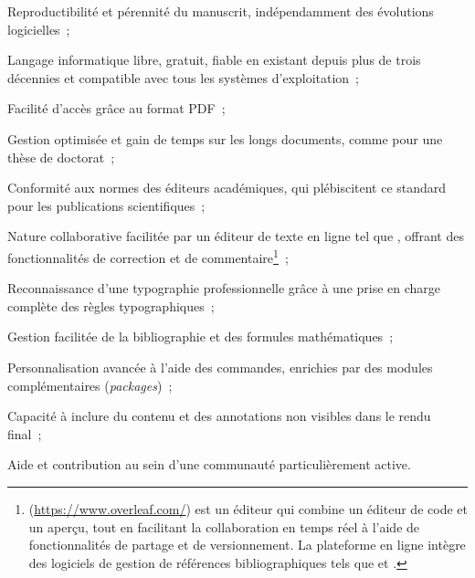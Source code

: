     \begin{customitemize}
\item Reproductibilité et pérennité du manuscrit, indépendamment des évolutions logicielles~;
\item Langage informatique libre, gratuit, fiable en existant depuis plus de trois décennies et compatible avec tous les systèmes d'exploitation~;
\item Facilité d'accès grâce au format PDF~;
\item Gestion optimisée et gain de temps sur les longs documents, comme pour une thèse de doctorat~;
\item Conformité aux normes des éditeurs académiques, qui plébiscitent ce standard pour les publications scientifiques~;
\item Nature collaborative facilitée par un éditeur de texte en ligne tel que , offrant des fonctionnalités de correction et de commentaire\footnote{
 (\url{https://www.overleaf.com/}) est un éditeur \latexword{\LaTeX} qui combine un éditeur de code et un aperçu, tout en facilitant la collaboration en temps réel à l'aide de fonctionnalités de partage et de versionnement. La plateforme en ligne intègre des logiciels de gestion de références bibliographiques tels que  et .
}~;
\item Reconnaissance d'une typographie professionnelle grâce à une prise en charge complète des règles typographiques~;
\item Gestion facilitée de la bibliographie et des formules mathématiques~;
\item Personnalisation avancée à l'aide des commandes, enrichies par des modules complémentaires (\textsl{packages})~;
\item Capacité à inclure du contenu et des annotations non visibles dans le rendu final~;
\item Aide et contribution au sein d'une communauté \latexword{\LaTeX} particulièrement active.
    \end{customitemize}%

